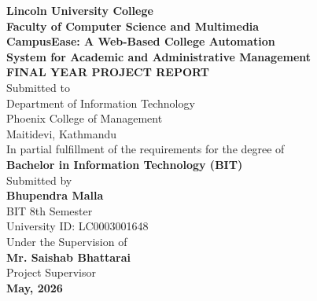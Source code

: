 \documentclass[12pt,a4paper]{report}
\begin{document}
\hypersetup{pageanchor=false}

\begin{titlepage}
\begin{center}


\textbf{\fontsize{14}{17}\selectfont Lincoln University College}\\[4pt]
\textbf{\fontsize{12}{15}\selectfont Faculty of Computer Science and Multimedia}\\[26pt]

\textbf{\fontsize{16}{19}\selectfont CampusEase: A Web-Based College Automation\\
System for Academic and Administrative Management}\\[24pt]

\textbf{\fontsize{14}{17}\selectfont FINAL YEAR PROJECT REPORT}\\[10pt]
\fontsize{12}{15}\selectfont
Submitted to\\[4pt]
Department of Information Technology\\
Phoenix College of Management\\
Maitidevi, Kathmandu\\[20pt]

In partial fulfillment of the requirements for the degree of\\
\textbf{Bachelor in Information Technology (BIT)}\\[24pt]

Submitted by\\[8pt]
\textbf{Bhupendra Malla}\\
BIT 8th Semester\\
University ID: LC0003001648\\[18pt]

Under the Supervision of\\[4pt]
\textbf{Mr. Saishab Bhattarai}\\
Project Supervisor\\[18pt]

\textbf{May, 2026}

\end{center}
\end{titlepage}
\end{document}

